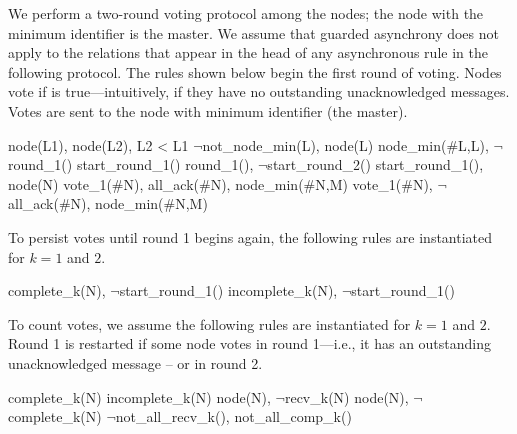 We perform a two-round voting protocol among the nodes; the node with the minimum identifier is the master.  We assume that guarded asynchrony does not apply to the relations that appear in the head of any asynchronous rule in the following protocol.  The rules shown below begin the first round of voting.  Nodes vote  if  is true---intuitively, if they have no outstanding unacknowledged messages.  Votes are sent to the node with minimum identifier (the master).

\begin{Drules}
      {node(L1), node(L2), L2 < L1}
      {$\lnot$not_node_min(L), node(L)}
      {node_min(#L,L), $\lnot$round_1()}
      {start_round_1()}
      {round_1(), $\lnot$start_round_2()}
      {start_round_1(), node(N)}
      {vote_1(#N), all_ack(#N), node_min(#N,M)}
      {vote_1(#N), $\lnot$all_ack(#N), node_min(#N,M)}
\end{Drules}

To persist votes until round 1 begins again, the following rules are instantiated for $k=1$ and $2$.

\begin{Drules}
      {complete_k(N), $\lnot$start_round_1()}
      {incomplete_k(N), $\lnot$start_round_1()}
\end{Drules}

To count votes, we assume the following rules are instantiated for $k=1$ and $2$.  Round 1 is restarted if some node votes  in round 1---i.e., it has an outstanding unacknowledged message -- or  in round 2.

\begin{Drules}
      {complete_k(N)}
      {incomplete_k(N)}
      {node(N), $\lnot$recv_k(N)}
      {node(N), $\lnot$complete_k(N)}
      {$\lnot$not_all_recv_k(), not_all_comp_k()}
\end{Drules}

